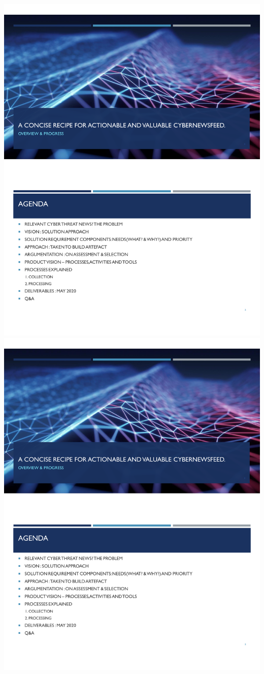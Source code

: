 \includegraphics[page=6,scale=0.75]{Appendices/Threat-Brief-Product-Jeroen-jean.pdf} 
\includegraphics[page=7,scale=0.75]{Appendices/Threat-Brief-Product-Jeroen-jean.pdf} 
